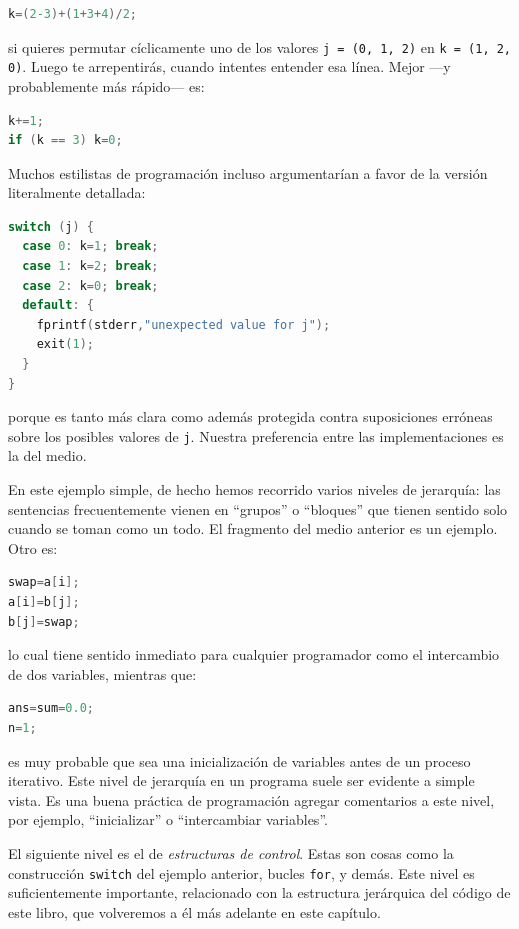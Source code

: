 \documentclass[10pt,a4paper]{book}
\begin{document}
\begin{lstlisting}[language=C]
k=(2-3)+(1+3+4)/2;
\end{lstlisting}

si quieres permutar cíclicamente uno de los valores \texttt{j = (0, 1, 2)} en \texttt{k = (1, 2, 0)}. Luego te arrepentirás, cuando intentes entender esa línea. Mejor —y probablemente más rápido— es:

\begin{lstlisting}[language=C]
k+=1;
if (k == 3) k=0;
\end{lstlisting}

Muchos estilistas de programación incluso argumentarían a favor de la versión literalmente detallada:

\begin{lstlisting}[language=C]
switch (j) {
  case 0: k=1; break;
  case 1: k=2; break;
  case 2: k=0; break;
  default: {
    fprintf(stderr,"unexpected value for j");
    exit(1);
  }
}
\end{lstlisting}

porque es tanto más clara como además protegida contra suposiciones erróneas sobre los posibles valores de \texttt{j}. Nuestra preferencia entre las implementaciones es la del medio.

\medskip

En este ejemplo simple, de hecho hemos recorrido varios niveles de jerarquía: las sentencias frecuentemente vienen en “grupos” o “bloques” que tienen sentido solo cuando se toman como un todo. El fragmento del medio anterior es un ejemplo. Otro es:

\begin{lstlisting}[language=C]
swap=a[i];
a[i]=b[j];
b[j]=swap;
\end{lstlisting}

lo cual tiene sentido inmediato para cualquier programador como el intercambio de dos variables, mientras que:

\begin{lstlisting}[language=C]
ans=sum=0.0;
n=1;
\end{lstlisting}

es muy probable que sea una inicialización de variables antes de un proceso iterativo. Este nivel de jerarquía en un programa suele ser evidente a simple vista. Es una buena práctica de programación agregar comentarios a este nivel, por ejemplo, “inicializar” o “intercambiar variables”.

\medskip

El siguiente nivel es el de \textit{estructuras de control}. Estas son cosas como la construcción \texttt{switch} del ejemplo anterior, bucles \texttt{for}, y demás. Este nivel es suficientemente importante, relacionado con la estructura jerárquica del código de este libro, que volveremos a él más adelante en este capítulo.
\end{document}
